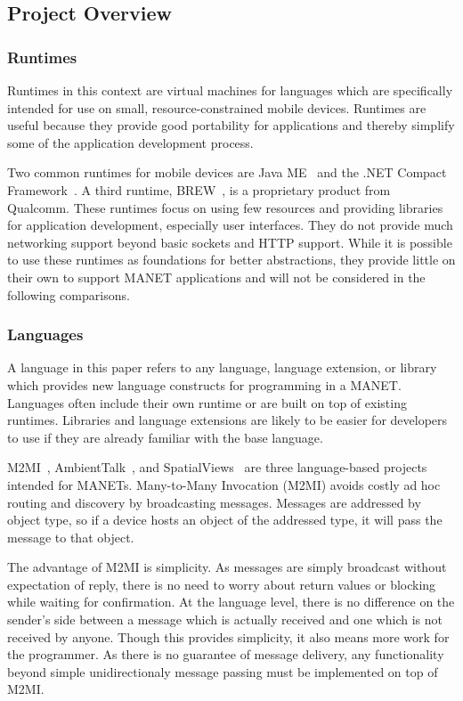 \subsection{Project Overview}

\subsubsection{Runtimes}

Runtimes in this context are virtual machines for languages which are specifically intended for use on small, resource-constrained mobile devices. Runtimes are useful because they provide good portability for applications and thereby simplify some of the application development process.

Two common runtimes for mobile devices are Java ME~\cite{javame} and the .NET Compact Framework~\cite{dotnetcf}. A third runtime, BREW~\cite{brew}, is a proprietary product from Qualcomm. These runtimes focus on using few resources and providing libraries for application development, especially user interfaces. They do not provide much networking support beyond basic sockets and HTTP support. While it is possible to use these runtimes as foundations for better abstractions, they provide little on their own to support MANET applications and will not be considered in the following comparisons.

\subsubsection{Languages}

A language in this paper refers to any language, language extension, or library which provides new language constructs for programming in a MANET. Languages often include their own runtime or are built on top of existing runtimes. Libraries and language extensions are likely to be easier for developers to use if they are already familiar with the base language.

M2MI~\cite{m2mi}, AmbientTalk~\cite{ambienttalk}, and SpatialViews~\cite{nisv} are three language-based projects intended for MANETs. Many-to-Many Invocation (M2MI) avoids costly ad hoc routing and discovery by broadcasting messages. Messages are addressed by object type, so if a device hosts an object of the addressed type, it will pass the message to that object.

The advantage of M2MI is simplicity. As messages are simply broadcast without expectation of reply, there is no need to worry about return values or blocking while waiting for confirmation. At the language level, there is no difference on the sender's side between a message which is actually received and one which is not received by anyone. Though this provides simplicity, it also means more work for the programmer. As there is no guarantee of message delivery, any functionality beyond simple unidirectionaly message passing must be implemented on top of M2MI.

